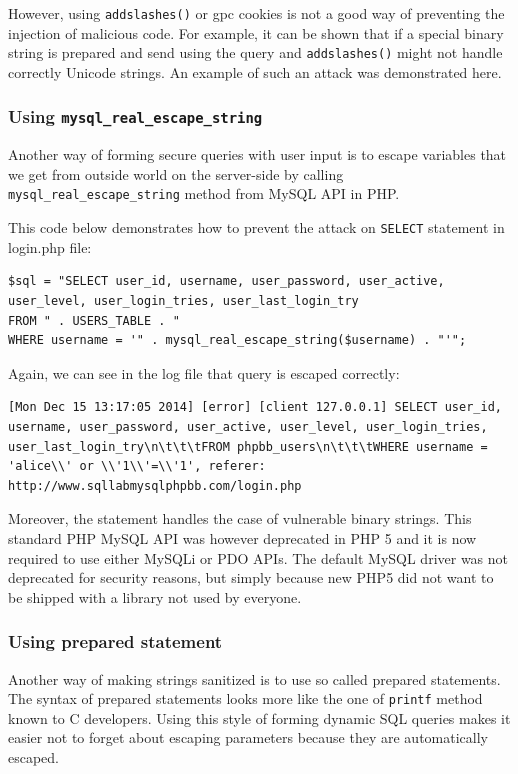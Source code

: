 \documentclass[12pt, a4paper, pdflatex]{article}
\begin{document}
However, using  \texttt{addslashes()} or gpc cookies is not a good way of preventing the injection of malicious code. For example, it can be shown that if a special binary string is prepared and send using the query and \texttt{addslashes()} might not handle correctly Unicode strings. An example of such an attack was demonstrated here\cite{shiflett06}.

\subsubsection{Using \texttt{mysql\_real\_escape\_string}}

Another way of forming secure queries with user input is to escape variables that we get from outside world on the server-side by calling \texttt{mysql\_real\_escape\_string} method from MySQL API in PHP.

This code below demonstrates how to prevent the attack on \texttt{SELECT} statement in login.php file:

\lstset{
	captionpos=b,
	frame=single,
	language=PHP,
	breaklines=true,
	label=sqladdslash
}
\begin{lstlisting}
$sql = "SELECT user_id, username, user_password, user_active, user_level, user_login_tries, user_last_login_try
FROM " . USERS_TABLE . "
WHERE username = '" . mysql_real_escape_string($username) . "'";
\end{lstlisting}
Again, we can see in the log file that query is escaped correctly:
\lstset{
	captionpos=b,
	frame=single,
	language=SQL,
	breaklines=true,
	label=sqladdslash
}
\begin{lstlisting}
[Mon Dec 15 13:17:05 2014] [error] [client 127.0.0.1] SELECT user_id, username, user_password, user_active, user_level, user_login_tries, user_last_login_try\n\t\t\tFROM phpbb_users\n\t\t\tWHERE username = 'alice\\' or \\'1\\'=\\'1', referer: http://www.sqllabmysqlphpbb.com/login.php
\end{lstlisting}
Moreover, the statement handles the case of vulnerable binary strings\cite{shiflett06}. This standard PHP MySQL API was however deprecated in PHP 5 and it is now required to use either MySQLi or PDO APIs. The default MySQL driver was not deprecated for security reasons, but simply because new PHP5 did not want to be shipped with a library not used by everyone.\cite{phpfaq}

\subsubsection{Using prepared statement}
Another way of making strings sanitized is to use so called prepared statements. The syntax of prepared statements looks more like the one of \texttt{printf} method known to C developers. Using this style of forming dynamic SQL queries makes it easier not to forget about escaping parameters because they are automatically escaped.
\end{document}
